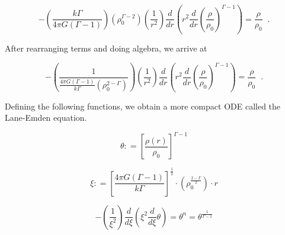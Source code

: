 \begin{equation}
-\left( \frac{k \Gamma}{4\pi G(\Gamma-1)} \right)\left( \rho_0^{\Gamma-2} \right) \left(\frac{1}{r^2}\right) \frac{d}{dr} \left(r^2 {\frac{d}{dr}\left(\frac{\rho}{\rho_0}\right)}^{\Gamma-1} \right) =  \frac{\rho}{\rho_0}\;\;.
\end{equation}

After rearranging terms and doing algebra, we arrive at

%
%

\begin{equation}\label{pre.lane-emden}
-\left( \frac{1}{\frac{4\pi G(\Gamma-1)}{k \Gamma }\left( \rho_0^{2-\Gamma} \right)} \right) \left(\frac{1}{r^2}\right) \frac{d}{dr} \left(r^2 {\frac{d}{dr}\left(\frac{\rho}{\rho_0}\right)}^{\Gamma-1} \right) =  \frac{\rho}{\rho_0}\;\; .
\end{equation}

Defining the following functions, we obtain a more compact ODE called the Lane-Emden equation.

\begin{equation}\label{lane-emden0}
\theta : = \left[ \frac{\rho(r)}{\rho_0} \right]^{\Gamma -1} 
\end{equation}

\begin{equation}\label{lane-emden1}
\xi : = \left[ \frac{4\pi G (\Gamma-1)}{k \Gamma} \right]^{\frac{1}{2}} \cdot \left( \rho_0^{\frac{2-\Gamma}{2}} \right) \cdot r
\end{equation}

\begin{equation}\label{LE}
- \left(\frac{1}{\xi^2}\right) \frac{d}{d\xi} \left(\xi^2 \frac{d}{d\xi} \theta \right) = \theta^n =  \theta^{\frac{1}{\Gamma-1}}
\end{equation}


